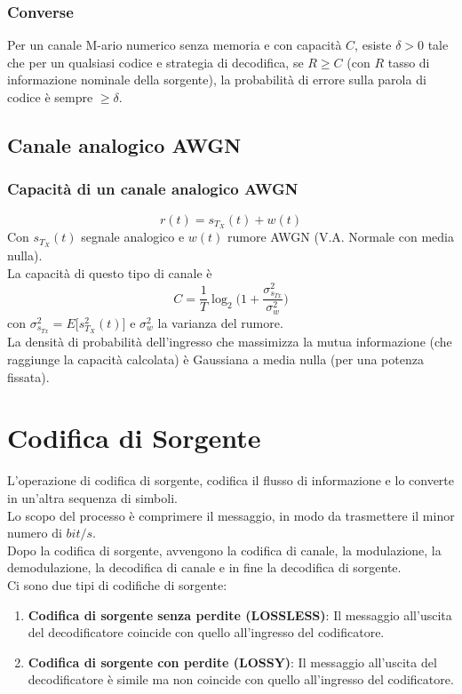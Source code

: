 \documentclass{article}
\begin{document}
\subsubsection{Converse}
Per un canale M-ario numerico senza memoria e con capacità $C$, esiste $\delta>0$ tale che per un qualsiasi codice e strategia di decodifica, se $R\geq C$ (con $R$ tasso di informazione nominale della sorgente), la probabilità di errore sulla parola di codice è sempre $\geq\delta$.\\

\subsection{Canale analogico AWGN}

\subsubsection{Capacità di un canale analogico AWGN}
$$r(t)=s_{T_X}(t)+w(t)$$
Con $s_{T_X}(t)$ segnale analogico e $w(t)$ rumore AWGN (V.A. Normale con media nulla).\\
La capacità di questo tipo di canale è $$C=\frac{1}{T}\log_2\big(1+\frac{\sigma_{s_{Tx}}^2}{\sigma_w^2}\big)$$
con $\sigma_{s_{Tx}}^2=E\big[s_{T_X}^2(t)\big]$ e $\sigma_w^2$ la varianza del rumore.\\
La densità di probabilità dell'ingresso che massimizza la mutua informazione (che raggiunge la capacità calcolata) è Gaussiana a media nulla (per una potenza fissata).







\newpage
\section{Codifica di Sorgente}
L'operazione di codifica di sorgente, codifica il flusso di informazione e lo converte in un'altra sequenza di simboli.\\
Lo scopo del processo è comprimere il messaggio, in modo da trasmettere il minor numero di $bit/s$.\\
Dopo la codifica di sorgente, avvengono la codifica di canale, la modulazione, la demodulazione, la decodifica di canale e in fine la decodifica di sorgente.\\
Ci sono due tipi di codifiche di sorgente:
\begin{enumerate}
	\item \textbf{Codifica di sorgente senza perdite (LOSSLESS)}: Il messaggio all'uscita del decodificatore coincide con quello all'ingresso del codificatore.
	\item \textbf{Codifica di sorgente con perdite (LOSSY)}: Il messaggio all'uscita del decodificatore è simile ma non coincide con quello all'ingresso del codificatore.
\end{enumerate}
\end{document}
